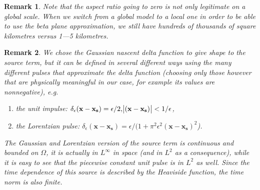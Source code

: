 \documentclass[11pt]{article}
\newtheorem{remark}{Remark}
\begin{document}
\begin{remark}
\normalfont Note that the aspect ratio going to zero is not only legitimate on a global scale. When we switch from a global model to a local one in order to be able to use the beta plane approximation, we still have hundreds of thousands of square kilometres versus 1---5 kilometres.
\end{remark}

\begin{remark}
\normalfont We chose the Gaussian nascent delta function to give shape to the source term, but it can be defined in several different ways using the many different pulses that approximate the delta function (choosing only those however that are physically meaningful in our case, for example its values are nonnegative), e.g.

  \begin{enumerate}
  
    \item the unit impulse: $\delta_\epsilon (\mathbf{x}-\mathbf{x_s}) = \epsilon/2, \abs{(\mathbf{x}-\mathbf{x_s})} < 1/\epsilon $,
  
    \item the Lorentzian pulse: $\delta_\epsilon (\mathbf{x}-\mathbf{x_s}) = \epsilon / (1 + \pi^2 \epsilon^2 (\mathbf{x}-\mathbf{x_s})^2$).

  \end{enumerate}
  
  The Gaussian and Lorentzian version of the source term is continuous and bounded on $\Omega$, it is actually in $L^\infty$ in space (and in $L^2$ as a consequence), while it is easy to see that the piecewise constant unit pulse is in $L^2$ as well. Since the time dependence of this source is described by the Heaviside function, the time norm is also finite.
  
\end{remark}
\end{document}
